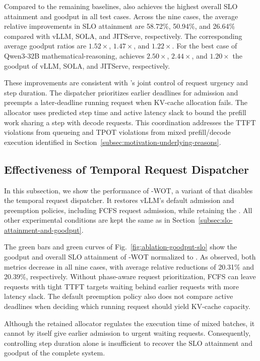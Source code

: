 Compared to the remaining baselines, \tango{} also achieves the highest overall SLO attainment and goodput in all test cases.
Across the nine cases, the average relative improvements in SLO attainment are 58.72\%, 50.94\%, and 26.64\% compared with vLLM, SOLA, and JITServe, respectively.
The corresponding average goodput ratios are $1.52\times$, $1.47\times$, and $1.22\times$.
For the best case of Qwen3-32B mathematical-reasoning, \tango{} achieves $2.50\times$, $2.44\times$, and $1.20\times$ the goodput of vLLM, SOLA, and JITServe, respectively.

These improvements are consistent with \tango{}'s joint control of request urgency and step duration.
The dispatcher prioritizes earlier deadlines for admission and preempts a later-deadline running request when KV-cache allocation fails.
The allocator uses predicted step time and active latency slack to bound the prefill work sharing a step with decode requests.
This coordination addresses the TTFT violations from queueing and TPOT violations from mixed prefill/decode execution identified in Section~\ref{subsec:motivation-underlying-reasons}.

\subsection{Effectiveness of Temporal Request Dispatcher}
\label{subsec:effectiveness-temporal-scheduling}

In this subsection, we show the performance of \tango{}-WOT, a variant of \tango{} that disables the temporal request dispatcher.
It restores vLLM's default admission and preemption policies, including FCFS request admission, while retaining the \allocator{}.
All other experimental conditions are kept the same as in Section~\ref{subsec:slo-attainment-and-goodput}.

The green bars and green curves of Fig.~\ref{fig:ablation-goodput-slo} show the goodput and overall SLO attainment of \tango{}-WOT normalized to \tango{}.
As observed, both metrics decrease in all nine cases, with average relative reductions of 20.31\% and 20.39\%, respectively.
Without phase-aware request prioritization, FCFS can leave requests with tight TTFT targets waiting behind earlier requests with more latency slack.
The default preemption policy also does not compare active deadlines when deciding which running request should yield KV-cache capacity.

Although the retained allocator regulates the execution time of mixed batches, it cannot by itself give earlier admission to urgent waiting requests.
Consequently, controlling step duration alone is insufficient to recover the SLO attainment and goodput of the complete system.

